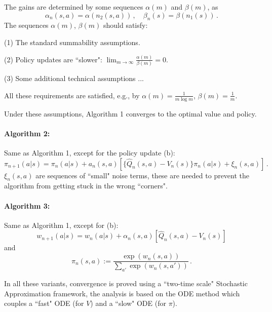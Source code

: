 \begin{itemize}
The gains are determined by some sequences $\alpha(m)$ and $\beta(m)$, as
$$
\alpha_n(s,a)=\alpha(n_2(s,a))\,,\quad \beta_n(s)=\beta(n_1(s)) \,.
$$
The sequences $\alpha(m)$, $\beta(m)$  should satisfy:

(1) The standard summability assumptions.

(2) Policy updates are ``slower":  $\lim_{m\to\infty}\frac{\alpha(m)}{\beta(m)}=0$.

(3) Some additional technical assumptions ...

All these requirements are satisfied, e.g., by
$\alpha(m)=\frac{1}{m\log m}$, $\beta(m)=\frac{1}{m}$.
\end{itemize}

Under these assumptions, Algorithm 1 converges to the optimal value and
policy.



\paragraph{Algorithm 2:}

Same as Algorithm 1, except for the policy update (b):
$$
\pi_{n+1}(a|s)=\pi_n(a|s)+a_n(s,a)[\{\hat Q_n(s,a)-V_n(s)\}\pi_n(a|s)+\xi_n(s,a)
] \,.
$$
$\xi_n(s,a)$ are sequences of  ``small" noise terms, these are needed to prevent
 the algorithm
from getting stuck in the wrong ``corners".


\paragraph{Algorithm 3:}

Same as Algorithm 1, except for  (b):
$$
w_{n+1}(a|s)=w_n(a|s)+\alpha_n(s,a)[\hat Q_n(s,a)-V_n(s)]
$$
and
$$
\pi_n(s,a):=\frac{\exp(w_n(s,a))}{\sum_{a'}\exp(w_n(s,a'))} \,.
$$



In all these variants, convergence is proved using a ``two-time scale"
Stochastic Approximation framework, the analysis is based on the ODE
method which couples a ``fast"
ODE (for $V$) and a ``slow" ODE  (for $\pi$).

%
%
%
